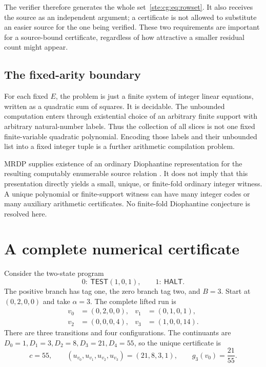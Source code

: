 \documentclass[11pt,letterpaper]{article}
\theoremstyle{definition}
\theoremstyle{remark}
\newcommand{\TEST}{\mathsf{TEST}}
\newcommand{\HALT}{\mathsf{HALT}}
\begin{document}
The verifier therefore generates the whole set~\eqref{ste:cg:eq:rowset}. It also
receives the source as an independent argument; a certificate is not
allowed to substitute an easier source for the one being verified.
These two requirements are important for a source-bound certificate,
regardless of how attractive a smaller residual count might appear.

\subsection{The fixed-arity boundary}
For each fixed $E$, the problem is just a finite system of integer linear
equations, written as a quadratic sum of squares. It is decidable.
The unbounded computation enters through existential choice of an
arbitrary finite support with arbitrary natural-number labels. Thus the
collection of all slices is not one fixed finite-variable quadratic
polynomial. Encoding those labels and their unbounded list into a fixed
integer tuple is a further arithmetic compilation problem.

MRDP supplies existence of an ordinary Diophantine representation for the
resulting computably enumerable source relation \cite{matiyasevich1970}. It does not imply that
this presentation directly yields a small, unique, or finite-fold ordinary
integer witness. A unique polynomial or finite-support witness can have
many integer codes or many auxiliary arithmetic certificates. No
finite-fold Diophantine conjecture is resolved here.

\section{A complete numerical certificate}\label{ste:cg:sec:example}
Consider the two-state program
\begin{equation}\label{ste:cg:eq:exampleprogram}
 0:\ \TEST(1,0,1),\qquad 1:\ \HALT.
\end{equation}
The positive branch has tag one, the zero branch tag two, and $B=3$.
Start at $(0,2,0,0)$ and take $\alpha=3$. The complete lifted run is
\begin{align*}
 v_0&=(0,2,0,0),&v_1&=(0,1,0,1),\\
 v_2&=(0,0,0,4),&v_3&=(1,0,0,14).
\end{align*}
There are three transitions and four configurations. The continuants are
$D_0=1,D_1=3,D_2=8,D_3=21,D_4=55$, so the unique certificate is
\begin{equation}\label{ste:cg:eq:examplecertificate}
 c=55,\qquad (u_{v_0},u_{v_1},u_{v_2},u_{v_3})=(21,8,3,1),
 \qquad g_3(v_0)=\frac{21}{55}.
\end{equation}
\end{document}
